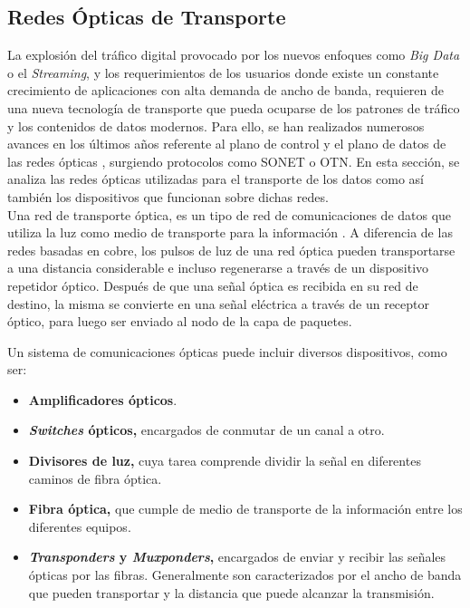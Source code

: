 \subsection{Redes Ópticas de Transporte}
La explosión del tráfico digital provocado por los nuevos enfoques como \textit{Big Data} o el \textit{Streaming}, y los requerimientos de los usuarios donde existe un constante crecimiento de aplicaciones con alta demanda de ancho de banda, requieren de una nueva tecnología de transporte que pueda ocuparse de los patrones de tráfico y los contenidos de datos modernos. Para ello, se han realizados numerosos avances en los últimos años referente al plano de control y el plano de datos de las redes ópticas \parencite{redesopticas}, surgiendo protocolos como SONET o OTN. En esta sección, se analiza las redes ópticas utilizadas para el transporte de los datos como así también los dispositivos que funcionan sobre dichas redes. 
\\

Una red de transporte óptica, es un tipo de red de comunicaciones de datos que utiliza la luz como medio de transporte para la información \parencite{redesopticasdef}. A diferencia de las redes basadas en cobre, los pulsos de luz de una red óptica pueden transportarse a una distancia considerable e incluso regenerarse a través de un dispositivo repetidor óptico. Después de que una señal óptica es recibida en su red de destino, la misma se convierte en una señal eléctrica a través de un receptor óptico, para luego ser enviado al nodo de la capa de paquetes. 

Un sistema de comunicaciones ópticas puede incluir diversos dispositivos, como ser:

\begin{itemize}
	\item \textbf{Amplificadores ópticos}. 
	\item \textbf{\textit{Switches} ópticos,} encargados de conmutar de un canal a otro.
	\item \textbf{Divisores de luz,} cuya tarea comprende dividir la señal en diferentes caminos de fibra óptica.
	\item \textbf{Fibra óptica,} que cumple de medio de transporte de la información entre los diferentes equipos.
	\item \textbf{\textit{Transponders} y \textit{Muxponders},} encargados de enviar y recibir las señales ópticas por las fibras. Generalmente son caracterizados por el ancho de banda que pueden transportar y la distancia que puede alcanzar la transmisión.
\end{itemize}

